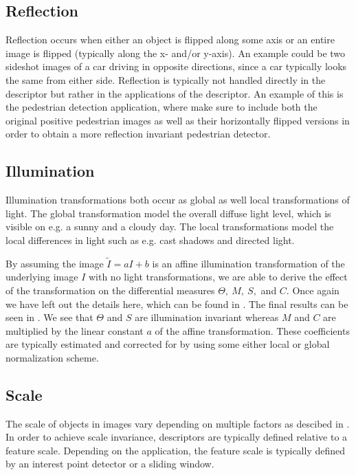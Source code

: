 \documentclass[thesis.tex]{subfiles}
\begin{document}
\subsection{Reflection}
Reflection occurs when either an object is flipped along some axis or an entire image is flipped (typically along the x- and/or y-axis). An example could be two sideshot images of a car driving in opposite directions, since a car typically looks the same from either side. Reflection is typically not handled directly in the descriptor but rather in the applications of the descriptor. An example of this is the pedestrian detection application, where \cite{dalal2005histograms} make sure to include both the original positive pedestrian images as well as their horizontally flipped versions in order to obtain a more reflection invariant pedestrian detector.

\subsection{Illumination}
\label{sec:illumination}
Illumination transformations both occur as global as well local transformations of light. The global transformation model the overall diffuse light level, which is visible on e.g. a sunny and a cloudy day. The local transformations model the local differences in light such as e.g. cast shadows and directed light.

By assuming the image $\tilde{I} = a I +  b$ is an affine illumination transformation of the underlying image $I$ with no light transformations, we are able to derive the effect of the transformation on the differential measures $\Theta,~M,~S,$ and $C$. Once again we have left out the details here, which can be found in . The final results can be seen in . We see that $\Theta$ and $S$ are illumination invariant whereas $M$ and $C$ are multiplied by the linear constant $a$ of the affine transformation. These coefficients are typically estimated and corrected for by using some either local or global normalization scheme.

\subsection{Scale}
\label{sec:scaleInvariance}

The scale of objects in images vary depending on multiple factors as descibed in . In order to achieve scale invariance, descriptors are typically defined relative to a feature scale. Depending on the application, the feature scale is typically defined by an interest point detector or a sliding window.
\end{document}
